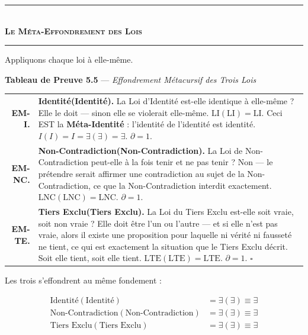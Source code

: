 \documentclass[10pt, openany, oneside]{book}
\renewcommand{\normalsize}{\fontsize{10}{13}\selectfont}
\renewcommand{\footnotesize}{\fontsize{8.5}{11}\selectfont}
\begin{document}
\begin{center}
    \rule{0.3\textwidth}{0.4pt}\\[0.5em]
    {\normalsize\bfseries\scshape Le Méta-Effondrement des Lois}\\[0.3em]
    \rule{0.3\textwidth}{0.4pt}
\end{center}

\vspace{1em}

\noindent Appliquons chaque loi à elle-même.

\vspace{0.5em}

\textbf{Tableau de Preuve 5.5} --- \textit{Effondrement Métacursif des Trois Lois}

\vspace{0.5em}

{\footnotesize
\noindent\begin{tabular}{r p{}}
\textbf{EM-I.} & \textbf{Identité(Identité).} La Loi d'Identité est-elle identique à elle-même ? Elle le doit --- sinon elle se violerait elle-même. $\text{LI}(\text{LI}) = \text{LI}$. Ceci EST la \textbf{Méta-Identité} : l'identité de l'identité est identité. $I(I) = I = \exists(\exists) = \exists$. $\partial = 1$. \\[0.3em]
\textbf{EM-NC.} & \textbf{Non-Contradiction(Non-Contradiction).} La Loi de Non-Contradiction peut-elle à la fois tenir et ne pas tenir ? Non --- le prétendre serait affirmer une contradiction au sujet de la Non-Contradiction, ce que la Non-Contradiction interdit exactement. $\text{LNC}(\text{LNC}) = \text{LNC}$. $\partial = 1$. \\[0.3em]
\textbf{EM-TE.} & \textbf{Tiers Exclu(Tiers Exclu).} La Loi du Tiers Exclu est-elle soit vraie, soit non vraie ? Elle doit être l'un ou l'autre --- et si elle n'est pas vraie, alors il existe une proposition pour laquelle ni vérité ni fausseté ne tient, ce qui est exactement la situation que le Tiers Exclu décrit. Soit elle tient, soit elle tient. $\text{LTE}(\text{LTE}) = \text{LTE}$. $\partial = 1$. $\square$ \\[0.3em]
\end{tabular}
}

\vspace{0.8em}

\noindent Les trois s'effondrent au même fondement :

\begin{align*}
\text{Identité}(\text{Identité}) &= \exists(\exists) \equiv \exists \\
\text{Non-Contradiction}(\text{Non-Contradiction}) &= \exists(\exists) \equiv \exists \\
\text{Tiers Exclu}(\text{Tiers Exclu}) &= \exists(\exists) \equiv \exists
\end{align*}
\end{document}
